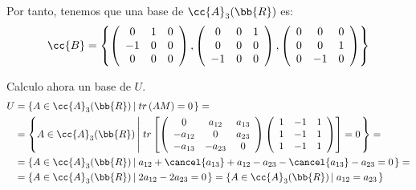 \documentclass[12pt]{article}
\begin{document}
\begin{ejercicio}
\begin{enumerate}
        Por tanto, tenemos que una base de $\cc{A}_3(\bb{R})$ es:
        \begin{equation*}
            \cc{B}=\left\{\left(\begin{array}{ccc}
                0 & 1 & 0 \\
                -1 & 0 & 0 \\
                0 & 0 & 0 \\
            \end{array}\right),
            \left(\begin{array}{ccc}
                0 & 0 & 1 \\
                0 & 0 & 0 \\
                -1 & 0 & 0 \\
            \end{array}\right),
            \left(\begin{array}{ccc}
                0 & 0 & 0 \\
                0 & 0 & 1 \\
                0 & -1 & 0 \\
            \end{array}\right)\right\}
        \end{equation*}


        Calculo ahora un base de $U$.
        \begin{equation}\label{ec:ParamU}\begin{split}
            U&= \left\{A\in \cc{A}_3(\bb{R}) \left|\;tr\left(AM\right)=0\right.\right\} =\\
            &= \left\{A\in \cc{A}_3(\bb{R}) \left|\;tr\left[
                \left(\begin{array}{ccc}
                    0 & a_{12} & a_{13} \\
                    -a_{12} & 0 & a_{23} \\
                    -a_{13} & -a_{23} & 0 \\
                \end{array}\right)
                \left(\begin{array}{ccc}
                    1 & -1 & 1 \\
                    1 & -1 & 1 \\
                    1 & -1 & 1
                \end{array}\right)
            \right]=0\right.\right\} =\\
            &= \left\{A\in \cc{A}_3(\bb{R}) \left|\;
            a_{12} + \cancel{a_{13}} + a_{12} - a_{23} - \cancel{a_{13}} - a_{23} = 0
            \right.\right\} =\\
            &= \left\{A\in \cc{A}_3(\bb{R}) \left|\;
            2a_{12} - 2a_{23} = 0
            \right.\right\} = \left\{A\in \cc{A}_3(\bb{R}) \left|\;
            a_{12} = a_{23}
            \right.\right\}
        \end{split}\end{equation}


\end{enumerate}
\end{ejercicio}
\end{document}
